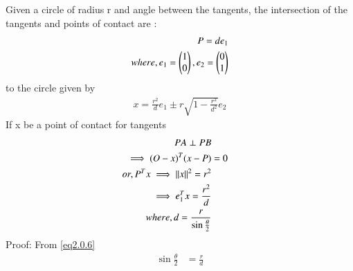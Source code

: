 \documentclass[journal,12pt,twocolumn]{IEEEtran}
\begin{document}
\begin{lemma}
\label{lemma}
Given a circle of radius r and angle  between the tangents, the intersection of the tangents and points of contact are :
\begin{align*}
P=de_1
\\
where, 
e_1=\begin{pmatrix}1\\0\end{pmatrix}, e_2=\begin{pmatrix}0\\1\end{pmatrix}\\
\end{align*}
to the circle given by
\begin{align}
x=\frac{r^2}{d}e_1\pm r\sqrt{1-\frac{r^2}{d^2}}e_2\label{eq2.0.1}
\end{align}
If x be a point of contact for tangents 
\begin{align}
PA\perp PB\\
\implies (O-x)^{T}(x-P) &=0\\
or, P^{T}x\implies \left\lVert x\right\rVert^2=r^2\\
\implies e_1^{T}x=\dfrac{r^2}{d}\\
where, d=\frac{r}{\sin\frac{\theta}{2}}\label{eq2.0.6}
\end{align}
Proof:
From \eqref{eq2.0.6}
\begin{align}
\sin{\frac{\theta}{2}} &=\frac{r}{d}
\end{align}


\end{lemma}
\end{document}
